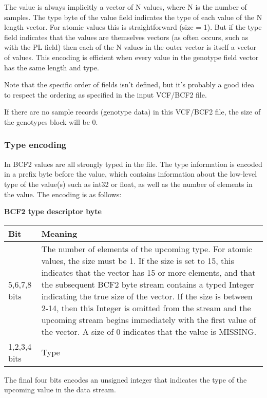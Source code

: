 \documentclass[8pt]{article}
\begin{document}
The value is always implicitly a vector of N values, where N is the number of samples.  The type byte of the value field indicates the type of each value of the N length vector.  For atomic values this is straightforward (size = 1).  But if the type field indicates that the values are themselves vectors (as often occurs, such as with the PL field) then each of the N values in the outer vector is itself a vector of values.  This encoding is efficient when every value in the genotype field vector has the same length and type.

Note that the specific order of fields isn't defined, but it's probably a good idea to respect the ordering as specified in the input VCF/BCF2 file.

If there are no sample records (genotype data) in this VCF/BCF2 file, the size of the genotypes block will be 0.


\subsubsection{Type encoding}

In BCF2 values are all strongly typed in the file.  The type information is encoded in a prefix byte before the value, which contains information about the low-level type of the value(s) such as int32 or float, as well as the number of elements in the value.  The encoding is as follows:

\vspace{0.3cm}
\textbf{BCF2 type descriptor byte}

\vspace{0.3cm}
\begin{tabular}{|p{2cm} | p{10cm}|} \hline
Bit & Meaning \\ \hline
5,6,7,8 bits & The number of elements of the upcoming type.  For atomic values, the size must be 1.  If the size is set to 15, this indicates that the vector has 15 or more elements, and that the subsequent BCF2 byte stream contains a typed Integer indicating the true size of the vector.  If the size is between 2-14, then this Integer is omitted from the stream and the upcoming stream begins immediately with the first value of the vector.  A size of 0 indicates that the value is MISSING. \\ \hline
1,2,3,4 bits & Type \\ \hline
\end{tabular}
\vspace{0.3cm}

The final four bits encodes an unsigned integer that indicates the type of the upcoming value in the data stream.
\end{document}
